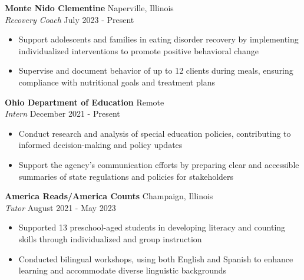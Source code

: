 \documentclass[a4paper]{article}
\begin{document}
    \vspace{1mm}

\textbf{Monte Nido Clementine} 
\hfill Naperville, Illinois\\
\textit{Recovery Coach} \hfill July 2023 - Present\\
    \begin{itemize}[noitemsep]
    \item Support adolescents and families in eating disorder recovery by implementing individualized interventions to promote positive behavioral change
    \item Supervise and document behavior of up to 12 clients during meals, ensuring compliance with nutritional goals and treatment plans
    \end{itemize}

    \vspace{1mm}

\textbf{Ohio Department of Education} 
\hfill Remote\\
\textit{Intern} \hfill December 2021 - Present\\
    \begin{itemize}[noitemsep]
    \item Conduct research and analysis of special education policies, contributing to informed decision-making and policy updates
    \item Support the agency’s communication efforts by preparing clear and accessible summaries of state regulations and policies for stakeholders
    \end{itemize}

    \vspace{1mm}

\textbf{America Reads/America Counts} 
\hfill Champaign, Illinois\\
\textit{Tutor} \hfill August 2021 - May 2023\\
    \begin{itemize}[noitemsep]
    \item Supported 13 preschool-aged students in developing literacy and counting skills through individualized and group instruction
    \item Conducted bilingual workshops, using both English and Spanish to enhance learning and accommodate diverse linguistic backgrounds
    \end{itemize}
    
\vspace*{1mm}
\end{document}
